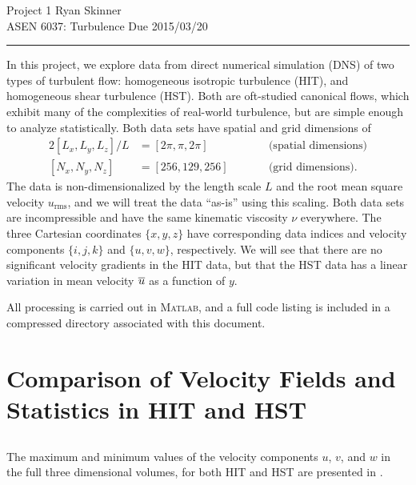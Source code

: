 \documentclass[11pt]{article}
\begin{document}
\pagestyle{fancyplain}
\lhead{}
\chead{}
\rhead{}
\cfoot{\thepage}

\noindent
{\Large \color{blue} Project 1}
\hfill
{\large Ryan Skinner}
\\[0.5ex]
{\large ASEN 6037: Turbulence}
\hfill
{\large Due 2015/03/20}
\hrule
\vspace{12pt}

In this project, we explore data from direct numerical simulation (DNS) of two types of turbulent flow: homogeneous isotropic turbulence (HIT), and homogeneous shear turbulence (HST). Both are oft-studied canonical flows, which exhibit many of the complexities of real-world turbulence, but are simple enough to analyze statistically. Both data sets have spatial and grid dimensions of
\begin{alignat*}{2}
[ L_x, L_y, L_z ] / L &= [ 2\pi, \pi, 2\pi ]
\qquad && \text{(spatial dimensions)}
\\
[ N_x, N_y, N_z ] &= [ 256, 129, 256 ]
\qquad && \text{(grid dimensions)}
.
\end{alignat*}
The data is non-dimensionalized by the length scale $L$ and the root mean square velocity $u_\text{rms}$, and we will treat the data ``as-is'' using this scaling. Both data sets are incompressible and have the same kinematic viscosity $\nu$ everywhere. The three Cartesian coordinates $\{x, y, z\}$ have corresponding data indices and velocity components $\{i, j, k\}$ and $\{u, v, w\}$, respectively. We will see that there are no significant velocity gradients in the HIT data, but that the HST data has a linear variation in mean velocity $\overline{u}$ as a function of $y$.

All processing is carried out in \textsc{Matlab}, and a full code listing is included in a compressed directory associated with this document.

\section{Comparison of Velocity Fields and Statistics in HIT and HST}

\subsection{}

The maximum and minimum values of the velocity components $u$, $v$, and $w$ in the full three dimensional volumes, for both HIT and HST are presented in .
\end{document}
